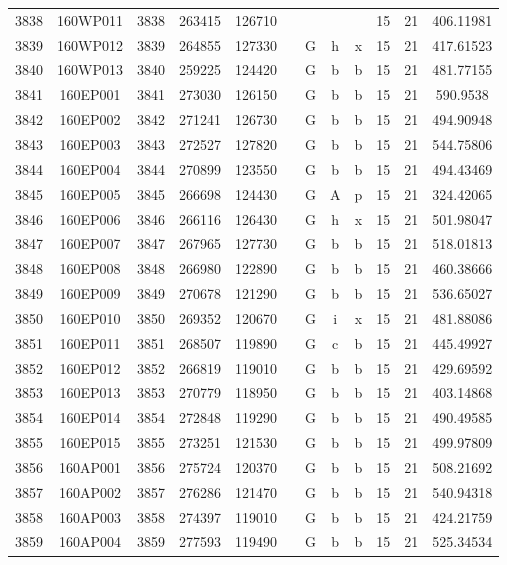 \begin{tabular}{|*{12}{c|}}
3838 & 160WP011 & 3838 & 263415 & 126710 &  &  &  &  & 15 & 21 & 406.11981 \\ 
3839 & 160WP012 & 3839 & 264855 & 127330 &  & G & h & x & 15 & 21 & 417.61523 \\ 
3840 & 160WP013 & 3840 & 259225 & 124420 &  & G & b & b & 15 & 21 & 481.77155 \\ 
3841 & 160EP001 & 3841 & 273030 & 126150 &  & G & b & b & 15 & 21 & 590.9538 \\ 
3842 & 160EP002 & 3842 & 271241 & 126730 &  & G & b & b & 15 & 21 & 494.90948 \\ 
3843 & 160EP003 & 3843 & 272527 & 127820 &  & G & b & b & 15 & 21 & 544.75806 \\ 
3844 & 160EP004 & 3844 & 270899 & 123550 &  & G & b & b & 15 & 21 & 494.43469 \\ 
3845 & 160EP005 & 3845 & 266698 & 124430 &  & G & A & p & 15 & 21 & 324.42065 \\ 
3846 & 160EP006 & 3846 & 266116 & 126430 &  & G & h & x & 15 & 21 & 501.98047 \\ 
3847 & 160EP007 & 3847 & 267965 & 127730 &  & G & b & b & 15 & 21 & 518.01813 \\ 
3848 & 160EP008 & 3848 & 266980 & 122890 &  & G & b & b & 15 & 21 & 460.38666 \\ 
3849 & 160EP009 & 3849 & 270678 & 121290 &  & G & b & b & 15 & 21 & 536.65027 \\ 
3850 & 160EP010 & 3850 & 269352 & 120670 &  & G & i & x & 15 & 21 & 481.88086 \\ 
3851 & 160EP011 & 3851 & 268507 & 119890 &  & G & c & b & 15 & 21 & 445.49927 \\ 
3852 & 160EP012 & 3852 & 266819 & 119010 &  & G & b & b & 15 & 21 & 429.69592 \\ 
3853 & 160EP013 & 3853 & 270779 & 118950 &  & G & b & b & 15 & 21 & 403.14868 \\ 
3854 & 160EP014 & 3854 & 272848 & 119290 &  & G & b & b & 15 & 21 & 490.49585 \\ 
3855 & 160EP015 & 3855 & 273251 & 121530 &  & G & b & b & 15 & 21 & 499.97809 \\ 
3856 & 160AP001 & 3856 & 275724 & 120370 &  & G & b & b & 15 & 21 & 508.21692 \\ 
3857 & 160AP002 & 3857 & 276286 & 121470 &  & G & b & b & 15 & 21 & 540.94318 \\ 
3858 & 160AP003 & 3858 & 274397 & 119010 &  & G & b & b & 15 & 21 & 424.21759 \\ 
3859 & 160AP004 & 3859 & 277593 & 119490 &  & G & b & b & 15 & 21 & 525.34534 \\ 

\end{tabular}
